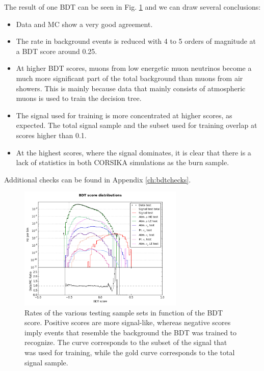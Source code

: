\noindent The result of one BDT can be seen in Fig. \ref{fig:singlebdtrate} and we can draw several conclusions:
\vspace{2mm}
\begin{itemize}
\item Data and MC show a very good agreement.
\item The rate in background events is reduced with 4 to 5 orders of magnitude at a BDT score around 0.25.
\item At higher BDT scores, muons from low energetic muon neutrinos become a much more significant part of the total background than muons from air showers. This is mainly because data that mainly consists of atmospheric muons is used to train the decision tree.
\item The signal used for training is more concentrated at higher scores, as expected. The total signal sample and the subset used for training overlap at scores higher than 0.1.
\item At the highest scores, where the signal dominates, it is clear that there is a lack of statistics in both CORSIKA simulations as the burn sample.
\end{itemize}
\vspace{2mm}
Additional checks can be found in Appendix \ref{ch:bdtchecks}.\\

\begin{figure}
\centering
\includegraphics[width = 0.7\textwidth]{chapter8/img/dist_vs_bdt_result2_signal_m_100_charge1ovr2_better.png}
\caption{Rates of the various testing sample sets in function of the BDT score. Positive scores are more signal-like, whereas negative scores imply events that resemble the background the BDT was trained to recognize. The curve corresponds to the subset of the signal that was used for training, while the gold curve corresponds to the total signal sample.}
\label{fig:singlebdtrate}
\end{figure}

